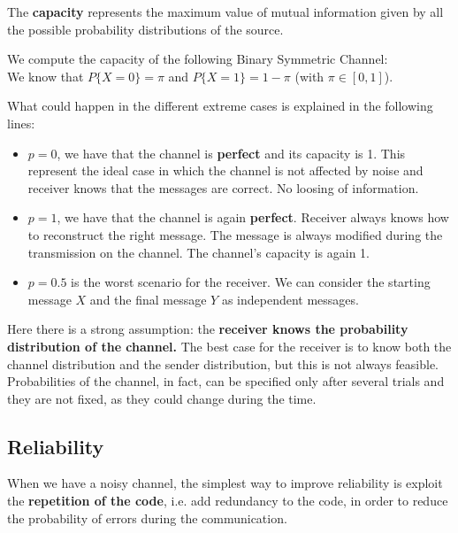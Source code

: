 The \textbf{capacity} represents the maximum value of mutual information given by all the possible probability distributions of the source. 
\begin{exmp}
	We compute the capacity of the following Binary Symmetric Channel:\\
	We know that $P\{X=0\} = \pi$ and $P\{X=1\} = 1-\pi$ (with $\pi \in [0,1]$).

What could happen in the different extreme cases is explained in the following lines:
\begin{itemize}
	\item $p = 0$, we have that the channel is \textbf{perfect} and its capacity is 1. This represent the ideal case in which the channel is not affected by noise and receiver knows that the messages are correct. No loosing of information.
	
	\item $p = 1$, we have that the channel is again \textbf{perfect}. Receiver always knows how to reconstruct the right message. The message is always modified during the transmission on the channel. The channel's capacity is again 1.
	
	\item $p=0.5$ is the worst scenario for the receiver. We can consider the starting message $X$ and the final message $Y$ as independent messages.
\end{itemize}
\end{exmp}
Here there is a strong assumption: the \textbf{receiver knows the probability distribution of the channel.}
The best case for the receiver is to know both the channel distribution and the sender distribution, but this is not always feasible.
Probabilities of the channel, in fact, can be specified only after several trials and they are not fixed, as they could change during the time.

\subsection{Reliability}
When we have a noisy channel, the simplest way to improve reliability is exploit the \textbf{repetition of the code}, i.e. add redundancy to the code, in order to reduce the probability of errors during the communication.

